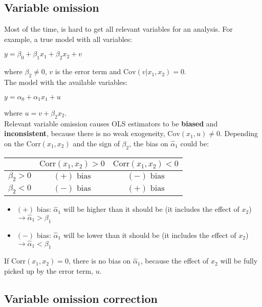 \documentclass[10pt, a4paper, landscape]{extarticle}
\newcommand{\Cov}{\mathrm{Cov}}
\newcommand{\Corr}{\mathrm{Corr}}
\begin{document}
\begin{multicols}{3}
\section*{Variable omission}
	Most of the time, is hard to get all relevant variables for an analysis. For example, a true model with all variables:
	\begin{center}
		$y = \beta_0 + \beta_1 x_1 + \beta_2 x_2 + v$
	\end{center}
	\quad where $\beta_2 \neq 0$, $v$ is the error term and $\Cov(v|x_1,x_2) = 0$. \\
	The model with the available variables:
	\begin{center}
		$y = \alpha_0 + \alpha_1 x_1 + u$
	\end{center}
	\quad where $u = v + \beta_2 x_2$. \\
	Relevant variable omission causes OLS estimators to be \textbf{biased} and \textbf{inconsistent}, because there is no weak exogeneity, $\Cov(x_1,u) \neq 0$. Depending on the $\Corr(x_1, x_2)$ and the sign of $\beta_2$, the bias on $\hat{\alpha}_1$ could be:
	\begin{center}
		\begin{tabular}{ c | c c }
			\multicolumn{1}{c|}{} & $\Corr(x_1, x_2) > 0$ & $\Corr(x_1, x_2) < 0$ \\ \hline
			$\beta_2 > 0$         & $(+) \text{ bias}$    & $(-) \text{ bias}$    \\
			$\beta_2 < 0$         & $(-) \text{ bias}$    & $(+) \text{ bias}$    \\
		\end{tabular}
	\end{center}
	\begin{itemize}[leftmargin=*]
		\item $(+)$ bias: $\hat{\alpha}_1$ will be higher than it should be (it includes the effect of $x_2$) $\rightarrow \hat{\alpha}_1 > \beta_1$
		\item $(-)$ bias: $\hat{\alpha}_1$ will be lower than it should be (it includes the effect of $x_2$) $\rightarrow \hat{\alpha}_1 < \beta_1$
	\end{itemize}
	If $\Corr(x_1,x_2) = 0$, there is no bias on $\hat{\alpha}_1$, because the effect of $x_2$ will be fully picked up by the error term, $u$.
\columnbreak
	\subsection*{Variable omission correction}

\end{multicols}
\end{document}
